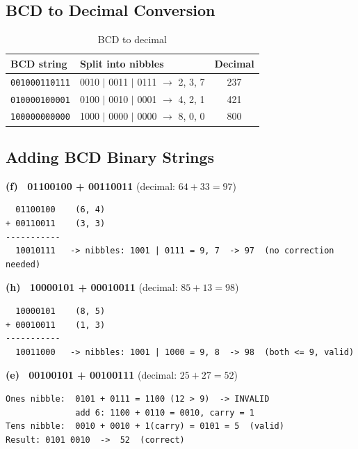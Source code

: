 \documentclass[12pt,a4paper]{article}
\begin{document}
\subsection{BCD to Decimal Conversion}

\begin{table}[H]
\centering
\caption{BCD to decimal}
\begin{tabular}{|l|l|c|}
\hline
\textbf{BCD string} & \textbf{Split into nibbles} & \textbf{Decimal} \\
\hline
\texttt{001000110111}   & 0010 $|$ 0011 $|$ 0111 $\to$ 2, 3, 7 & 237 \\
\hline
\texttt{010000100001}   & 0100 $|$ 0010 $|$ 0001 $\to$ 4, 2, 1 & 421 \\
\hline
\texttt{100000000000}   & 1000 $|$ 0000 $|$ 0000 $\to$ 8, 0, 0 & 800 \\
\hline
\end{tabular}
\end{table}

\subsection{Adding BCD Binary Strings}

\textbf{(f) \ 01100100 + 00110011} \quad (decimal: $64 + 33 = 97$)

\begin{verbatim}
  01100100    (6, 4)
+ 00110011    (3, 3)
-----------
  10010111   -> nibbles: 1001 | 0111 = 9, 7  -> 97  (no correction needed)
\end{verbatim}

\textbf{(h) \ 10000101 + 00010011} \quad (decimal: $85 + 13 = 98$)

\begin{verbatim}
  10000101    (8, 5)
+ 00010011    (1, 3)
-----------
  10011000   -> nibbles: 1001 | 1000 = 9, 8  -> 98  (both <= 9, valid)
\end{verbatim}

\textbf{(e) \ 00100101 + 00100111} \quad (decimal: $25 + 27 = 52$)

\begin{verbatim}
Ones nibble:  0101 + 0111 = 1100 (12 > 9)  -> INVALID
              add 6: 1100 + 0110 = 0010, carry = 1
Tens nibble:  0010 + 0010 + 1(carry) = 0101 = 5  (valid)
Result: 0101 0010  ->  52  (correct)
\end{verbatim}
\end{document}
